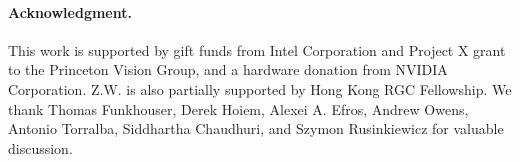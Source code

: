 \documentclass[10pt,twocolumn,letterpaper]{article}
\begin{document}
\paragraph{Acknowledgment.}
This work is supported by gift funds from Intel Corporation and Project X grant to the Princeton Vision Group,
and a hardware donation from NVIDIA Corporation.
Z.W. is also partially supported by Hong Kong RGC Fellowship.
We thank 
Thomas Funkhouser, 
Derek Hoiem, 
Alexei A. Efros, Andrew Owens, Antonio Torralba, Siddhartha Chaudhuri, and Szymon Rusinkiewicz for valuable discussion.


{\small


}
\end{document}
